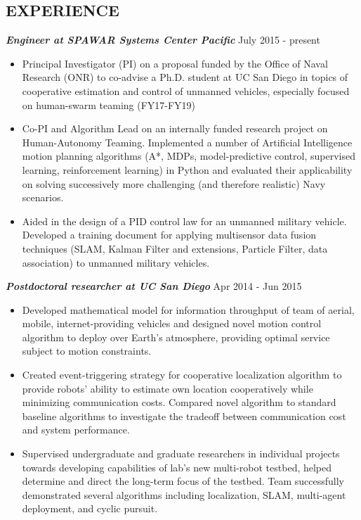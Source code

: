\documentclass{res}
\begin{document}
\begin{resume}
\section{EXPERIENCE}
{\sl \bf Engineer at SPAWAR Systems Center Pacific} \hfill July 2015 - present 
\begin{itemize}
\item Principal Investigator (PI) on a proposal funded by the Office of Naval Research (ONR) to co-advise a Ph.D. student at UC San Diego in topics of cooperative estimation and control of unmanned vehicles, especially focused on human-swarm teaming (FY17-FY19)
\item Co-PI and Algorithm Lead on an internally funded research project on Human-Autonomy Teaming. Implemented a number of Artificial Intelligence motion planning algorithms (A*, MDPs, model-predictive control, supervised learning, reinforcement learning) in Python and evaluated their applicability on solving successively more challenging (and therefore realistic) Navy scenarios.
\item Aided in the design of a PID control law for an unmanned military vehicle.  Developed a training document for applying multisensor data fusion techniques (SLAM, Kalman Filter and extensions, Particle Filter, data association) to unmanned military vehicles.
\end{itemize}
\vspace*{-1ex}
{\sl \bf Postdoctoral researcher at UC San Diego} \hfill Apr 2014 - Jun 2015 
\begin{itemize}
\item Developed mathematical model for information throughput of team of aerial, mobile, internet-providing vehicles and designed novel motion control algorithm to deploy over Earth's atmosphere, providing optimal service subject to motion constraints.
%
\item Created event-triggering strategy for cooperative localization algorithm to provide robots' ability to estimate own location cooperatively while minimizing communication costs. Compared novel algorithm to standard baseline algorithms to investigate the tradeoff between communication cost and system performance.
\item Supervised undergraduate and graduate researchers in individual projects towards developing capabilities of lab's new multi-robot testbed, helped determine and direct the long-term focus of the testbed.  Team successfully demonstrated several algorithms including localization, SLAM, multi-agent deployment, and cyclic pursuit. 

\end{itemize}
\end{resume}
\end{document}
